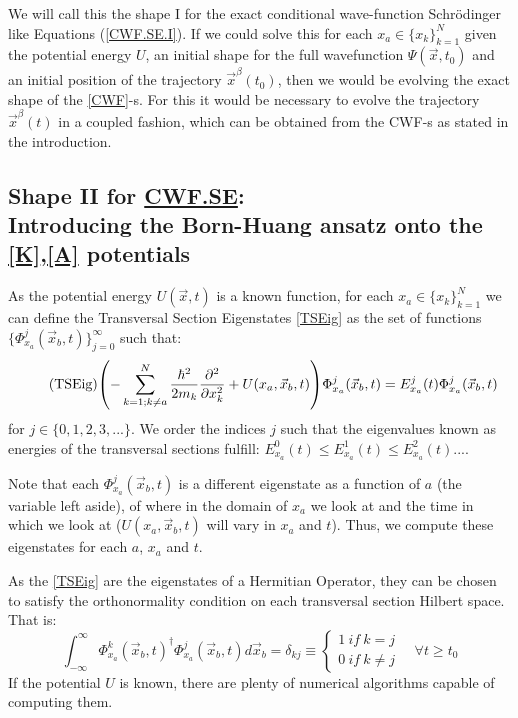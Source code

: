 \documentclass[11pt, a4paper]{article} %
\begin{document}
We will call this the shape I for the exact conditional wave-function Schrödinger like Equations (\ref{CWF.SE.I}). If we could solve this for each $x_a\in\{x_k\}_{k=1}^N$ given the potential energy $U$, an initial shape for the full wavefunction $\Psi(\vec{x}, t_0)$ and an initial position of the trajectory $\vec{x}^\beta(t_0)$, then we would be evolving the exact shape of the \ref{CWF}-s. For this it would be necessary to evolve the trajectory $\vec{x}^\beta(t)$ in a coupled fashion, which can be obtained from the CWF-s as stated in the introduction.\vspace{-0.2cm}

\subsection{Shape II for \hyperref[CWF.SE]{CWF.SE}:\\ Introducing the Born-Huang ansatz onto the \ref{K},\ref{A} potentials\vspace{-0.2cm}}

As the potential energy $U(\vec{x},t)$ is a known function, for each $x_a\in\{x_k\}_{k=1}^N$  we can define the Transversal Section Eigenstates \ref{TSEig} as the set of functions $\{\Phi_{x_a}^j(\vec{x}_b,t)\}_{j=0}^\infty$ such that:\vspace{-0.2cm}
\begin{equation}\label{TSEig}\tag{TSEig}
\qty(- \sum_{k=1; k\neq a}^{N} \frac{\hbar^2}{2m_k}\pdv[2]{}{x_k}+U(x_a,\vec{x}_b,t) )\Phi_{x_a}^j(\vec{x}_b,t) = E_{x_a}^j(t)\Phi_{x_a}^j(\vec{x}_b,t)
\end{equation}
for $j\in\{0,1,2,3,...\}$. We order the indices $j$ such that the eigenvalues known as energies of the transversal sections fulfill: $E_{x_a}^0(t)\leq E_{x_a}^1(t)\leq E_{x_a}^2(t)...$.

Note that each $\Phi_{x_a}^j(\vec{x}_b,t)$ is a different eigenstate as a function of $a$ (the variable left aside), of where in the domain of $x_a$ we look at and the time in which we look at ($U(x_a,\vec{x}_b,t)$ will vary in $x_a$ and $t$). Thus, we compute these eigenstates for each $a$, $x_a$ and $t$.

As the \ref{TSEig} are the eigenstates of a Hermitian Operator, they can be chosen to satisfy the orthonormality condition on each transversal section Hilbert space. That is:
$$
\int_{-\infty}^\infty \Phi_{x_a}^k(\vec{x}_b,t)^\dagger \Phi_{x_a}^j(\vec{x}_b,t) d\vec{x}_b=\delta_{kj} \equiv \begin{cases}1\ if\ k=j\\0\ if\ k\neq j \end{cases}\quad \forall t\geq t_0
$$
\vspace{-0.2cm}
If the potential $U$ is known, there are plenty of numerical algorithms capable of computing them.
\end{document}
